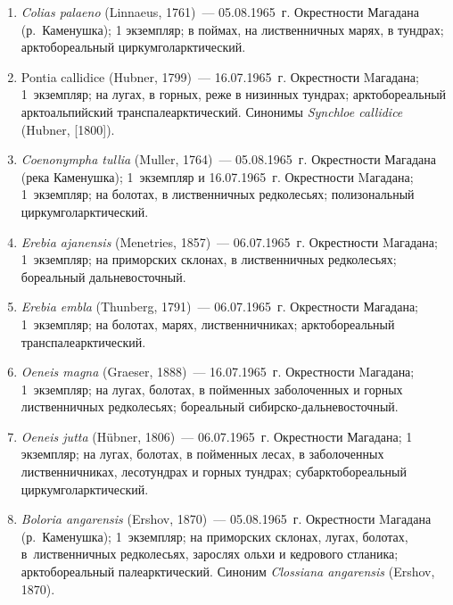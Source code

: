 \begin{enumerate}[noitemsep, leftmargin=0cm]

      \item \textit{Colias palaeno} (Linnaeus, 1761)~--- 05.08.1965~г. Окрестности Магадана (р.~Каменушка); 1 экземпляр; в поймах, на лиственничных марях, в тундрах; арктобореальный циркумголарктический.

      \item Pontia callidice (Hubner, 1799)~--- 16.07.1965~г. Окрестности Mагадана; 1~экземпляр; на лугах, в горных, реже в низинных тундрах; арктобореальный арктоальпийский транспалеарктический. Синонимы \textit{Synchloe callidice} (Hubner, [1800]).


      \item \textit{Coenonympha tullia} (Muller, 1764)~--- 05.08.1965~г. Окрестности Магадана (река Каменушка); 1~экземпляр и 16.07.1965~г. Окрестности Mагадана; 1~экземпляр; на болотах, в лиственничных редколесьях; полизональный циркумголарктический.

      \item \textit{Erebia ajanensis} (Menetries, 1857)~--- 06.07.1965~г. Окрестности Mагадана; 1~экземпляр; на приморских склонах, в лиственничных редколесьях; бореальный дальневосточный.

      \item  \textit{Erebia embla} (Thunberg, 1791)~--- 06.07.1965~г. Окрестности Магадана; 1~экземпляр; на болотах, марях, лиственничниках; арктобореальный транспалеарктический.

      \item \textit{Oeneis magna} (Graeser, 1888)~--- 16.07.1965~г. Окрестности Mагадана; 1~экземпляр; на лугах, болотах, в пойменных заболоченных и горных лиственничных редколесьях; бореальный сибирско-дальневосточный.

      \item \textit{Oeneis jutta} (Hübner, 1806)~--- 06.07.1965~г. Окрестности Магадана; 1 экземпляр; на лугах, болотах, в пойменных лесах, в заболоченных лиственничниках, лесотундрах и горных тундрах; субарктобореальный циркумголарктический.


      \item \textit{Boloria angarensis} (Ershov, 1870)~--- 05.08.1965~г. Окрестности Mагадана (р.~Каменушка); 1~экземпляр; на приморских склонах, лугах, болотах, в~лиственничных редколесьях, зарослях ольхи и кедрового стланика; арктобореальный палеарктический. Синоним \textit{Clossiana angarensis} (Ershov, 1870).
\end{enumerate}


